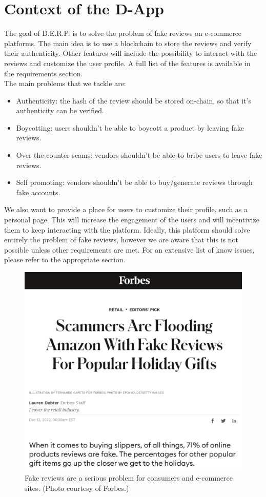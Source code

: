 \documentclass[12pt,a4paper,oneside]{article}
\theoremstyle{definition}
\begin{document}
\section{Context of the D-App}
The goal of D.E.R.P. is to solve the problem of fake reviews on e-commerce platforms. The main idea is to use a blockchain to store the reviews and verify their authenticity. Other features will include the possibility to interact with the reviews and customize the user profile. A full list of the features is available in the requirements section. \\
The main problems that we tackle are:
\begin{itemize}
	\item Authenticity: the hash of the review should be stored on-chain, so that it's authenticity can be verified.
	\item Boycotting: users shouldn't be able to boycott a product by leaving fake reviews.
	\item Over the counter scams: vendors shouldn't be able to bribe users to leave fake reviews.
	\item Self promoting: vendors shouldn't be able to buy/generate reviews through fake accounts.
\end{itemize}

We also want to provide a place for users to customize their profile, such as a personal page. This will increase the engagement of the users and will incentivize them to keep interacting with the platform.
Ideally, this platform should solve entirely the problem of fake reviews, however we are aware that this is not possible unless other requirements are met. For an extensive list of know issues, please refer to the appropriate section.

\begin{figure}[H]
	\centering
	\includegraphics[width=.49\linewidth]{figures/forbes-amazon.png}
	\caption{Fake reviews are a serious problem for consumers and e-commerce sites. (Photo courtesy of Forbes.)}
\end{figure}
\end{document}
